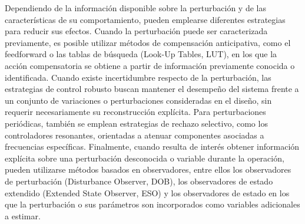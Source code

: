 %
%
%
%
%
%
%
%


Dependiendo de la información disponible sobre la perturbación y de las características de su comportamiento, pueden emplearse diferentes estrategias para reducir sus efectos. Cuando la perturbación puede ser caracterizada previamente, es posible utilizar métodos de compensación anticipativa, como el feedforward o las tablas de búsqueda (Look-Up Tables, LUT), en los que la acción compensatoria se obtiene a partir de información previamente conocida o identificada. Cuando existe incertidumbre respecto de la perturbación, las estrategias de control robusto buscan mantener el desempeño del sistema frente a un conjunto de variaciones o perturbaciones consideradas en el diseño, sin requerir necesariamente su reconstrucción explícita. Para perturbaciones periódicas, también se emplean estrategias de rechazo selectivo, como los controladores resonantes, orientadas a atenuar componentes asociadas a frecuencias específicas. Finalmente, cuando resulta de interés obtener información explícita sobre una perturbación desconocida o variable durante la operación, pueden utilizarse métodos basados en observadores, entre ellos los observadores de perturbación (Disturbance Observer, DOB), los observadores de estado extendido (Extended State Observer, ESO) y los observadores de estado en los que la perturbación o sus parámetros son incorporados como variables adicionales a estimar.
%
%
%
%
%
%
%
%
%
%
%

